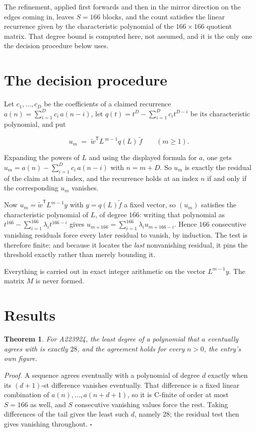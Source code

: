 \documentclass[11pt]{article}
\newtheorem{theorem}{Theorem}
\theoremstyle{definition}
\begin{document}
The refinement, applied first forwards and then in the mirror direction on the edges coming in, leaves $S = 166$ blocks, and the count satisfies the linear recurrence given by the characteristic polynomial of the $166 \times 166$ quotient matrix. That degree bound is computed here, not assumed, and it is the only one the decision procedure below uses.

\section{The decision procedure}

Let $c_1,\dots,c_D$ be the coefficients of a claimed recurrence $a(n) = \sum_{i=1}^{D} c_i\,a(n-i)$, let $q(t) = t^{D} - \sum_{i=1}^{D} c_i t^{D-i}$ be its characteristic polynomial, and put

\[u_m \;=\; \tilde w^{\mathsf T} L^{\,m-1} q(L)\,\tilde f \qquad (m \ge 1).\]

Expanding the powers of $L$ and using the displayed formula for $a$, one gets $u_m = a(n) - \sum_{i=1}^{D} c_i\,a(n-i)$ with $n = m + D$. So $u_m$ is exactly the residual of the claim at that index, and the recurrence holds at an index $n$ if and only if the corresponding $u_m$ vanishes.

Now $u_m = \tilde w^{\mathsf T} L^{m-1} y$ with $y = q(L)\tilde f$ a fixed vector, so $(u_m)$ satisfies the characteristic polynomial of $L$, of degree $166$: writing that polynomial as $t^{166} - \sum_{i=1}^{166} \lambda_i t^{166-i}$ gives $u_{m+166} = \sum_{i=1}^{166} \lambda_i u_{m+166-i}$. Hence $166$ consecutive vanishing residuals force every later residual to vanish, by induction. The test is therefore finite; and because it locates the {\itshape last} nonvanishing residual, it pins the threshold exactly rather than merely bounding it.

Everything is carried out in exact integer arithmetic on the vector $L^{m-1}y$. The matrix $M$ is never formed.

\section{Results}

\begin{theorem} For A223924, the least degree of a polynomial that $a$ eventually agrees with is exactly $28$, and the agreement holds for every $n > 0$, the entry's own figure.\end{theorem}

{\itshape Proof.} A sequence agrees eventually with a polynomial of degree $d$ exactly when its $(d+1)$-st difference vanishes eventually. That difference is a fixed linear combination of $a(n),\dots,a(n+d+1)$, so it is C-finite of order at most $S = 166$ as well, and $S$ consecutive vanishing values force the rest. Taking differences of the tail gives the least such $d$, namely $28$; the residual test then gives vanishing throughout. $\square$
\end{document}
